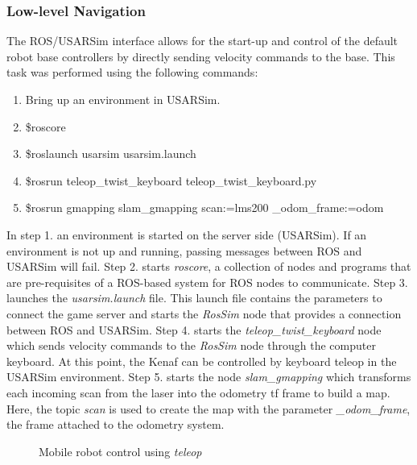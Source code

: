 \subsubsection*{Low-level Navigation}
The ROS/USARSim interface allows for the start-up and control of the default robot base controllers by directly sending velocity commands to the base. This task was performed using the following commands:
\begin{enumerate}
\item\footnotesize{Bring up an environment in USARSim.        }
\item\footnotesize{\$roscore}
\item\footnotesize{\$roslaunch usarsim usarsim.launch}
\item\footnotesize{\$rosrun teleop\_twist\_keyboard teleop\_twist\_keyboard.py}
\item\footnotesize{\$rosrun gmapping slam\_gmapping scan:=lms200 \_odom\_frame:=odom}
\end{enumerate}

In step 1. an environment is started on the server side (USARSim). If an environment is not up and running, passing messages between ROS and USARSim will fail. Step 2. starts {\it roscore}, a collection of nodes and programs that are pre-requisites of a ROS-based system for ROS nodes to communicate. Step 3. launches the {\it usarsim.launch} file. This launch file contains the parameters 
to connect the game server
and starts the {\it RosSim} node that provides a connection between ROS and USARSim. Step 4. starts the {\it teleop\_twist\_keyboard} node which sends velocity commands to the {\it RosSim} node through the computer keyboard. At this point, the Kenaf can be controlled by keyboard teleop in the USARSim environment. Step 5. starts the node {\it slam\_gmapping} which transforms each incoming scan from the laser into the odometry tf frame to build a map. Here, the topic {\it scan} is used to create the map with the parameter {\it \_odom\_frame}, the frame attached to the odometry system.


\begin{figure}[hbt!]
\centering
{}
\caption{\label{fig:teleop}Mobile robot control using {\it teleop}}
\end{figure}


